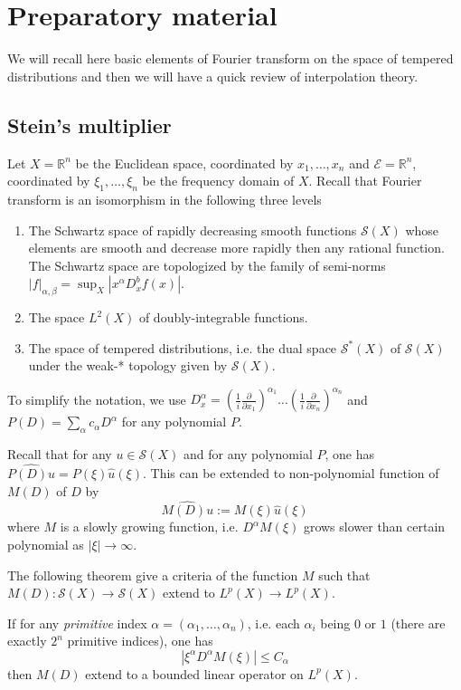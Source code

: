 \section{Preparatory material}
\label{sec:orgd4a87c1}
We will recall here basic elements of Fourier transform on the space of tempered
distributions and then we will have a quick review of interpolation theory.

\subsection{Stein's multiplier}
\label{sec:org7695576}
Let \(X = \mathbb{R}^n\) be the Euclidean space, coordinated by \(x_1,\dots, x_n\) and
\(\mathcal{E}= \mathbb{R}^n\), coordinated by \(\xi_1,\dots,\xi_n\) be the frequency
domain of \(X\). Recall that Fourier transform is an isomorphism in the following three levels
\begin{enumerate}
\item The Schwartz space of rapidly decreasing smooth functions \(\mathcal{S}(X)\) whose elements
are smooth and decrease more rapidly then any rational function. The Schwartz space are
topologized by the family of semi-norms \(|f|_{\alpha,\beta}= \sup_X |x^{\alpha} D^b_x f(x)|\).
\item The space \(L^2(X)\) of doubly-integrable functions.
\item The space of tempered distributions, i.e. the dual space \(\mathcal{S}^*(X)\) of \(\mathcal{S}(X)\) under the weak-* topology given by \(\mathcal{S}(X)\).
\end{enumerate}

To simplify the notation, we use \(D^\alpha_x = \left(\frac{1}{i}\frac{\partial}{\partial
x_1}\right)^{\alpha_1} \dots  \left(\frac{1}{i}\frac{\partial}{\partial
x_n}\right)^{\alpha_n}\) and \(P(D) = \sum_\alpha c_\alpha D^\alpha\) for any polynomial
\(P\). 

Recall that for any \(u\in \mathcal{S}(X)\)
and for any polynomial \(P\), one has  \(\widehat{P(D)u} = P(\xi)\hat u(\xi)\). This
can be extended to non-polynomial function of \(M(D)\) of \(D\) by
\[
 \widehat{M(D)u} := M(\xi)\hat u(\xi)
\]
where \(M\) is a slowly growing function, i.e. \(D^\alpha M(\xi)\) grows slower than
certain polynomial as \(|\xi|\to \infty\).

The following theorem give a criteria of the function \(M\) such that \(M(D):
\mathcal{S}(X) \longrightarrow \mathcal{S}(X)\) extend to \(L^p(X) \longrightarrow
L^p(X)\).

\begin{theorem}[Stein]
\label{thm:stein-crit}
If for any \emph{primitive} index \(\alpha=(\alpha_1,\dots,\alpha_n)\), i.e. each \(\alpha_i\) being \(0\) or \(1\) (there are exactly \(2^n\) primitive indices), one has
\[
 \left| \xi^\alpha D^\alpha M(\xi)\right| \leq C_\alpha
\]
then \(M(D)\) extend to a bounded linear operator on \(L^p(X)\).
\end{theorem}

